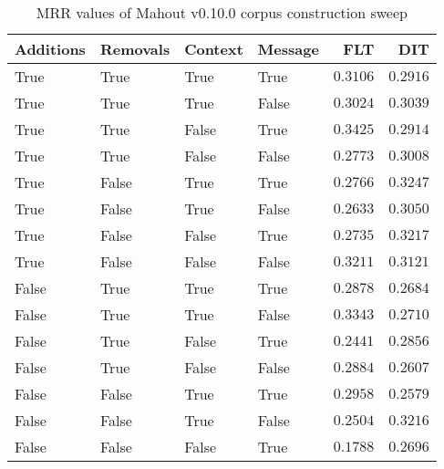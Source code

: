 
\begin{table}
\begin{spacing}{1.2}
\centering
\caption{MRR values of Mahout v0.10.0 corpus construction sweep}
\label{table:mahout_corpus_sweep}
\vspace{0.2em}
\begin{tabular}{llll|rr}
\toprule
Additions & Removals & Context & Message & FLT &        DIT \\
\midrule
     True &     True &    True &    True &         $0.3106$ &      $0.2916$ \\
     True &     True &    True &   False &         $0.3024$ &      $0.3039$ \\
     True &     True &   False &    True &    $\bm{0.3425}$ &      $0.2914$ \\
     True &     True &   False &   False &         $0.2773$ &      $0.3008$ \\
     True &    False &    True &    True &         $0.2766$ & $\bm{0.3247}$ \\
     True &    False &    True &   False &         $0.2633$ &      $0.3050$ \\
     True &    False &   False &    True &         $0.2735$ &      $0.3217$ \\
     True &    False &   False &   False &         $0.3211$ &      $0.3121$ \\
    False &     True &    True &    True &         $0.2878$ &      $0.2684$ \\
    False &     True &    True &   False &         $0.3343$ &      $0.2710$ \\
    False &     True &   False &    True &         $0.2441$ &      $0.2856$ \\
    False &     True &   False &   False &         $0.2884$ &      $0.2607$ \\
    False &    False &    True &    True &         $0.2958$ &      $0.2579$ \\
    False &    False &    True &   False &         $0.2504$ &      $0.3216$ \\
    False &    False &   False &    True &         $0.1788$ &      $0.2696$ \\
\bottomrule
\end{tabular}

\end{spacing}
\end{table}
